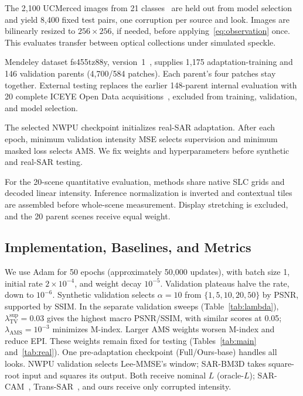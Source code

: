 \documentclass[journal]{IEEEtran}
\newcommand{\rev}[1]{{\color{RevisionBlue}#1}}
\newcommand{\condensed}[1]{{\color{CondensedGreen}#1}}
\newcommand{\rev}[1]{#1}
\newcommand{\condensed}[1]{#1}
\begin{document}
\condensed{The 2,100 UCMerced images from 21 classes~\cite{yang2010} are held out from model selection and yield 8,400 fixed test pairs, one corruption per source and look. Images are bilinearly resized to \(256\times256\), if needed, before applying~\eqref{eq:observation} once. This evaluates transfer between optical collections under simulated speckle.}

\rev{Mendeley dataset fs455tz88y, version~1~\cite{vasquez2024data}, supplies 1,175 adaptation-training and 146 validation parents (4,700/584 patches). Each parent's four patches stay together. External testing replaces the earlier 148-parent internal evaluation with 20 complete ICEYE Open Data acquisitions~\cite{iceyeOpenData}, excluded from training, validation, and model selection.}

\rev{The selected NWPU checkpoint initializes real-SAR adaptation. After each epoch, minimum validation intensity MSE selects supervision and minimum masked loss selects AMS. We fix weights and hyperparameters before synthetic and real-SAR testing.}

\rev{For the 20-scene quantitative evaluation, methods share native SLC grids and decoded linear intensity. Inference normalization is inverted and contextual tiles are assembled before whole-scene measurement. Display stretching is excluded, and the 20 parent scenes receive equal weight.}

\subsection{Implementation, Baselines, and Metrics}
\condensed{We use Adam for \rev{50 epochs (approximately 50,000 updates)}, with batch size 1, initial rate \rev{\(2\times10^{-4}\)}, and weight decay \(10^{-5}\). Validation plateaus halve the rate, down to \(10^{-6}\). Synthetic validation selects \(\alpha=10\) from \(\{1,5,10,20,50\}\) by PSNR, supported by SSIM. \rev{In the separate validation sweeps (Table~\ref{tab:lambda}), \(\lambda_{\mathrm{TV}}^{\mathrm{sup}}=0.03\) gives the highest macro PSNR/SSIM, with similar scores at 0.05; \(\lambda_{\mathrm{AMS}}=10^{-3}\) minimizes M-index. Larger AMS weights worsen M-index and reduce EPI. These weights remain fixed for testing (Tables~\ref{tab:main} and~\ref{tab:real}).} One pre-adaptation checkpoint (Full/Ours-base) handles all looks. NWPU validation selects Lee-MMSE's window; SAR-BM3D takes square-root input and squares its output. Both receive nominal \(L\) (oracle-\(L\)); SAR-CAM~\cite{ko2022}, Trans-SAR~\cite{perera2022}, and ours receive only corrupted intensity.}
\end{document}
